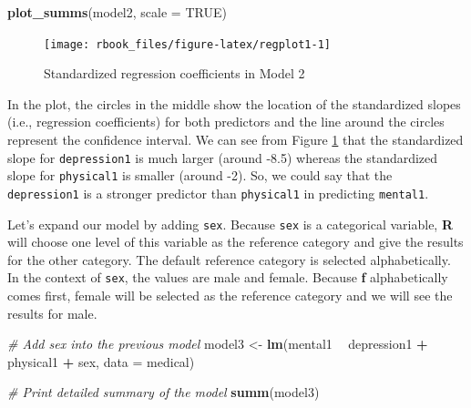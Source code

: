 \documentclass[]{book}
\newenvironment{Shaded}{\begin{snugshade}}{\end{snugshade}}
\newcommand{\CommentTok}[1]{\textcolor[rgb]{0.56,0.35,0.01}{\textit{#1}}}
\newcommand{\DataTypeTok}[1]{\textcolor[rgb]{0.13,0.29,0.53}{#1}}
\newcommand{\KeywordTok}[1]{\textcolor[rgb]{0.13,0.29,0.53}{\textbf{#1}}}
\newcommand{\NormalTok}[1]{#1}
\newcommand{\OperatorTok}[1]{\textcolor[rgb]{0.81,0.36,0.00}{\textbf{#1}}}
\newcommand{\OtherTok}[1]{\textcolor[rgb]{0.56,0.35,0.01}{#1}}
\newcommand{\StringTok}[1]{\textcolor[rgb]{0.31,0.60,0.02}{#1}}
\begin{document}
\begin{Shaded}
\begin{Highlighting}[]
\KeywordTok{plot_summs}\NormalTok{(model2, }\DataTypeTok{scale =} \OtherTok{TRUE}\NormalTok{)}
\end{Highlighting}
\end{Shaded}

\begin{figure}

{\centering \texttt{[image: rbook\_files/figure-latex/regplot1-1]} 

}

\caption{Standardized regression coefficients in Model 2}\label{fig:regplot1}
\end{figure}

In the plot, the circles in the middle show the location of the standardized slopes (i.e., regression coefficients) for both predictors and the line around the circles represent the confidence interval. We can see from Figure \ref{fig:regplot1} that the standardized slope for \texttt{depression1} is much larger (around -8.5) whereas the standardized slope for \texttt{physical1} is smaller (around -2). So, we could say that the \texttt{depression1} is a stronger predictor than \texttt{physical1} in predicting \texttt{mental1}.

Let's expand our model by adding \texttt{sex}. Because \texttt{sex} is a categorical variable, \textbf{R} will choose one level of this variable as the reference category and give the results for the other category. The default reference category is selected alphabetically. In the context of \texttt{sex}, the values are male and female. Because \textbf{f} alphabetically comes first, female will be selected as the reference category and we will see the results for male.

\begin{Shaded}
\begin{Highlighting}[]
\CommentTok{# Add sex into the previous model}
\NormalTok{model3 <-}\StringTok{ }\KeywordTok{lm}\NormalTok{(mental1 }\OperatorTok{~}\StringTok{ }\NormalTok{depression1 }\OperatorTok{+}\StringTok{ }\NormalTok{physical1 }\OperatorTok{+}\StringTok{ }\NormalTok{sex, }\DataTypeTok{data =}\NormalTok{ medical)}

\CommentTok{# Print detailed summary of the model}
\KeywordTok{summ}\NormalTok{(model3)}
\end{Highlighting}
\end{Shaded}
\end{document}
